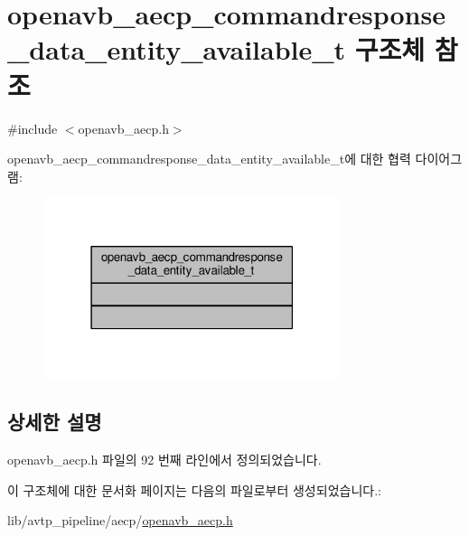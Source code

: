 \hypertarget{structopenavb__aecp__commandresponse__data__entity__available__t}{}\section{openavb\+\_\+aecp\+\_\+commandresponse\+\_\+data\+\_\+entity\+\_\+available\+\_\+t 구조체 참조}
\label{structopenavb__aecp__commandresponse__data__entity__available__t}


{\ttfamily \#include $<$openavb\+\_\+aecp.\+h$>$}



openavb\+\_\+aecp\+\_\+commandresponse\+\_\+data\+\_\+entity\+\_\+available\+\_\+t에 대한 협력 다이어그램\+:
\nopagebreak
\begin{figure}[H]
\begin{center}
\leavevmode
\includegraphics[width=247pt]{structopenavb__aecp__commandresponse__data__entity__available__t__coll__graph}
\end{center}
\end{figure}


\subsection{상세한 설명}


openavb\+\_\+aecp.\+h 파일의 92 번째 라인에서 정의되었습니다.



이 구조체에 대한 문서화 페이지는 다음의 파일로부터 생성되었습니다.\+:\begin{DoxyCompactItemize}
\item 
lib/avtp\+\_\+pipeline/aecp/\hyperlink{openavb__aecp_8h}{openavb\+\_\+aecp.\+h}\end{DoxyCompactItemize}
